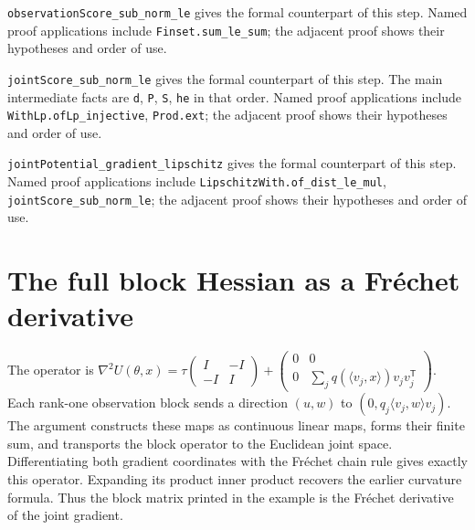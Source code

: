 \documentclass[11pt,a4paper]{article}
\begin{document}
\begin{leanbox}
\texttt{observation\allowbreak{}Score\_\allowbreak{}sub\_\allowbreak{}norm\_\allowbreak{}le} gives the formal counterpart of this step. Named proof applications include \texttt{Finset.\allowbreak{}sum\_\allowbreak{}le\_\allowbreak{}sum}; the adjacent proof shows their hypotheses and order of use.




\texttt{joint\allowbreak{}Score\_\allowbreak{}sub\_\allowbreak{}norm\_\allowbreak{}le} gives the formal counterpart of this step. The main intermediate facts are \texttt{d}, \texttt{P}, \texttt{S}, \texttt{he} in that order. Named proof applications include \texttt{With\allowbreak{}Lp.\allowbreak{}of\allowbreak{}Lp\_\allowbreak{}injective}, \texttt{Prod.\allowbreak{}ext}; the adjacent proof shows their hypotheses and order of use.




\texttt{joint\allowbreak{}Potential\_\allowbreak{}gradient\_\allowbreak{}lipschitz} gives the formal counterpart of this step. Named proof applications include \texttt{Lipschitz\allowbreak{}With.\allowbreak{}of\_\allowbreak{}dist\_\allowbreak{}le\_\allowbreak{}mul}, \texttt{joint\allowbreak{}Score\_\allowbreak{}sub\_\allowbreak{}norm\_\allowbreak{}le}; the adjacent proof shows their hypotheses and order of use.
\end{leanbox}

\section{\texorpdfstring{The full block Hessian as a Fréchet derivative}{The full block Hessian as a Fréchet derivative}}


The operator is \(\nabla^2U(\theta,x)=\tau\begin{pmatrix}I&-I\\-I&I\end{pmatrix}+\begin{pmatrix}0&0\\0&\sum_jq(\langle v_j,x\rangle)v_jv_j^{\mathsf T}\end{pmatrix}\). Each rank-one observation block sends a direction \((u,w)\) to \((0,q_j\langle v_j,w\rangle v_j)\). The argument constructs these maps as continuous linear maps, forms their finite sum, and transports the block operator to the Euclidean joint space. Differentiating both gradient coordinates with the Fréchet chain rule gives exactly this operator. Expanding its product inner product recovers the earlier curvature formula. Thus the block matrix printed in the example is the Fréchet derivative of the joint gradient.
\end{document}

